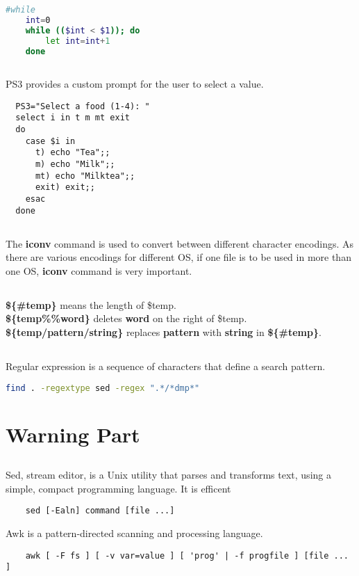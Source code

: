 \documentclass[12pt,a4paper]{article}
\theoremstyle{definition}
\begin{document}
\subsection{}
  \begin{lstlisting}[language=sh]
    #while
    int=0
    while (($int < $1)); do
        let int=int+1
    done
  \end{lstlisting}
\subsection{}
  PS3 provides a custom prompt for the user to select a value.
  \begin{lstlisting}
  PS3="Select a food (1-4): "
  select i in t m mt exit
  do
    case $i in
      t) echo "Tea";;
      m) echo "Milk";;
      mt) echo "Milktea";;
      exit) exit;;
    esac
  done
  \end{lstlisting}
\subsection{}
  The \textbf{iconv} command is used to convert between different character encodings. As there are various encodings for different OS, if one file is to be used in more than one OS, \textbf{iconv} command is very important.
\subsection{}
  \textbf{\$\{\#temp\}} means the length of \$temp. \\
  \textbf{\$\{temp\%\%word\}} deletes \textbf{word} on the right of \$temp. \\
  \textbf{\$\{temp/pattern/string\}} replaces \textbf{pattern} with \textbf{string} in \textbf{\$\{\#temp\}}.
\subsection{}
  Regular expression is a sequence of characters that define a search pattern.
  \begin{lstlisting}[language=sh]
    find . -regextype sed -regex ".*/*dmp*"
  \end{lstlisting}
\section{Warning Part}
\subsection{}
  Sed, stream editor, is a Unix utility that parses and transforms text, using a simple, compact programming language. It is efficent
  \begin{lstlisting}
    sed [-Ealn] command [file ...]
  \end{lstlisting}
  Awk is a pattern-directed scanning and processing language.
  \begin{lstlisting}
    awk [ -F fs ] [ -v var=value ] [ 'prog' | -f progfile ] [file ... ]
  \end{lstlisting}
\end{document}
